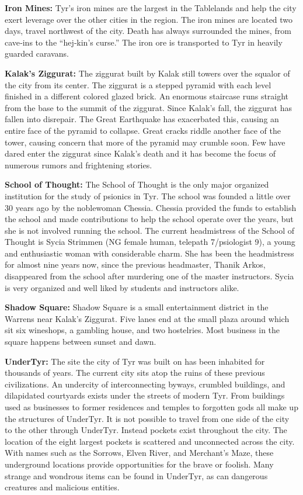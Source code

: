 {	\textbf{Iron Mines:} Tyr’s iron mines are the largest in the Tablelands and help the city exert leverage over the other cities in the region. The iron mines are located two days, travel northwest of the city. Death has always surrounded the mines, from cave‐ins to the “hej‐kin’s curse.” The iron ore is transported to Tyr in heavily guarded caravans.

	\textbf{Kalak’s Ziggurat:} The ziggurat built by Kalak still towers over the squalor of the city from its center. The ziggurat is a stepped pyramid with each level finished in a different colored glazed brick. An enormous staircase runs straight from the base to the summit of the ziggurat. Since Kalak’s fall, the ziggurat has fallen into disrepair. The Great Earthquake has exacerbated this, causing an entire face of the pyramid to collapse. Great cracks riddle another face of the tower, causing concern that more of the pyramid may crumble soon. Few have dared enter the ziggurat since Kalak’s death and it has become the focus of numerous rumors and frightening stories.

	\textbf{School of Thought:} The School of Thought is the only major organized institution for the study of psionics in Tyr. The school was founded a little over 30 years ago by the noblewoman Chessia. Chessia provided the funds to establish the school and made contributions to help the school operate over the years, but she is not involved running the school. The current headmistress of the School of Thought is Sycia Strimmen (NG female human, telepath 7/psiologist 9), a young and enthusiastic woman with considerable charm. She has been the headmistress for almost nine years now, since the previous headmaster, Thanik Arkos, disappeared from the school after murdering one of the master instructors. Sycia is very organized and well liked by students and instructors alike.

	\textbf{Shadow Square:} Shadow Square is a small entertainment district in the Warrens near Kalak’s Ziggurat. Five lanes end at the small plaza around which sit six wineshops, a gambling house, and two hostelries. Most business in the square happens between sunset and dawn.

	\textbf{UnderTyr:} The site the city of Tyr was built on has been inhabited for thousands of years. The current city sits atop the ruins of these previous civilizations. An undercity of interconnecting byways, crumbled buildings, and dilapidated courtyards exists under the streets of modern Tyr. From buildings used as businesses to former residences and temples to forgotten gods all make up the structures of UnderTyr. It is not possible to travel from one side of the city to the other through UnderTyr. Instead pockets exist throughout the city. The location of the eight largest pockets is scattered and unconnected across the city. With names such as the Sorrows, Elven River, and Merchant’s Maze, these underground locations provide opportunities for the brave or foolish. Many strange and wondrous items can be found in UnderTyr, as can dangerous creatures and malicious entities.

}
